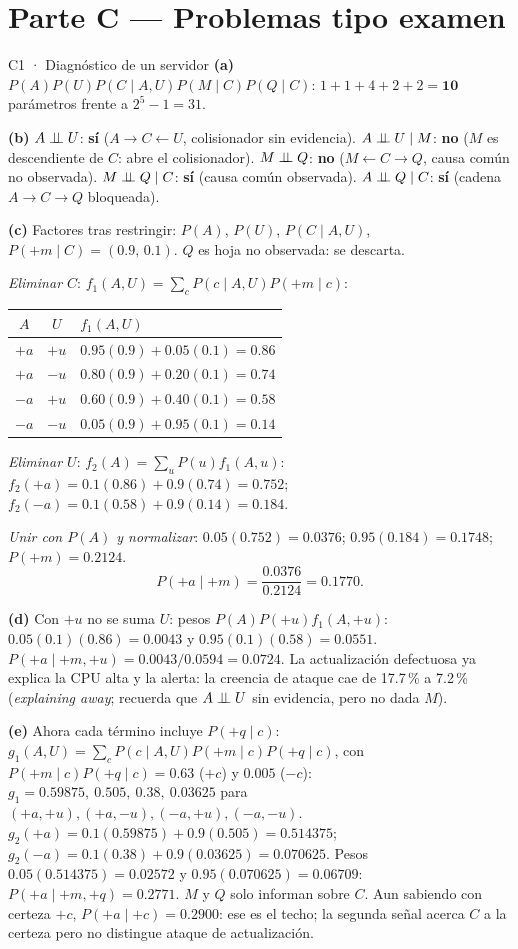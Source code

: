 \newpage
\section{Parte C — Problemas tipo examen}

\begin{solucion}{C1 · Diagnóstico de un servidor}
\textbf{(a)} $P(A)P(U)P(C\mid A,U)P(M\mid C)P(Q\mid C)$: $1+1+4+2+2=\mathbf{10}$ parámetros frente a $2^5-1=31$.

\textbf{(b)}
$A\perp\!\!\!\perp U$: \textbf{sí} ($A\to C\leftarrow U$, colisionador sin evidencia).
$A\perp\!\!\!\perp U\mid M$: \textbf{no} ($M$ es descendiente de $C$: abre el colisionador).
$M\perp\!\!\!\perp Q$: \textbf{no} ($M\leftarrow C\to Q$, causa común no observada).
$M\perp\!\!\!\perp Q\mid C$: \textbf{sí} (causa común observada).
$A\perp\!\!\!\perp Q\mid C$: \textbf{sí} (cadena $A\to C\to Q$ bloqueada).

\textbf{(c)} Factores tras restringir: $P(A)$, $P(U)$, $P(C\mid A,U)$, $P(+m\mid C)=(0.9,\,0.1)$. $Q$ es hoja no observada: se descarta.

\emph{Eliminar $C$}: $f_1(A,U)=\sum_cP(c\mid A,U)P(+m\mid c)$:
\begin{center}\small
\begin{tabular}{cc|l}
$A$ & $U$ & $f_1(A,U)$\\\hline
$+a$ & $+u$ & $0.95(0.9)+0.05(0.1)=0.86$\\
$+a$ & $-u$ & $0.80(0.9)+0.20(0.1)=0.74$\\
$-a$ & $+u$ & $0.60(0.9)+0.40(0.1)=0.58$\\
$-a$ & $-u$ & $0.05(0.9)+0.95(0.1)=0.14$
\end{tabular}
\end{center}
\emph{Eliminar $U$}: $f_2(A)=\sum_uP(u)f_1(A,u)$: $f_2(+a)=0.1(0.86)+0.9(0.74)=0.752$; $f_2(-a)=0.1(0.58)+0.9(0.14)=0.184$.

\emph{Unir con $P(A)$ y normalizar}: $0.05(0.752)=0.0376$; $0.95(0.184)=0.1748$; $P(+m)=0.2124$.
\[P(+a\mid+m)=\frac{0.0376}{0.2124}=\mathbf{0.1770}.\]

\textbf{(d)} Con $+u$ no se suma $U$: pesos $P(A)P(+u)f_1(A,+u)$: $0.05(0.1)(0.86)=0.0043$ y $0.95(0.1)(0.58)=0.0551$.
$P(+a\mid+m,+u)=0.0043/0.0594=\mathbf{0.0724}$. La actualización defectuosa ya explica la CPU alta y la alerta: la creencia de ataque cae de
17.7\,\% a 7.2\,\% (\emph{explaining away}; recuerda que $A\perp\!\!\!\perp U$ sin evidencia, pero no dada $M$).

\textbf{(e)} Ahora cada término incluye $P(+q\mid c)$: $g_1(A,U)=\sum_cP(c\mid A,U)P(+m\mid c)P(+q\mid c)$, con $P(+m\mid c)P(+q\mid c)=0.63$ ($+c$) y $0.005$ ($-c$):
$g_1=0.59875,\ 0.505,\ 0.38,\ 0.03625$ para $(+a,+u),(+a,-u),(-a,+u),(-a,-u)$.
$g_2(+a)=0.1(0.59875)+0.9(0.505)=0.514375$; $g_2(-a)=0.1(0.38)+0.9(0.03625)=0.070625$.
Pesos $0.05(0.514375)=0.02572$ y $0.95(0.070625)=0.06709$: $P(+a\mid+m,+q)=\mathbf{0.2771}$.
$M$ y $Q$ solo informan sobre $C$. Aun sabiendo con certeza $+c$, $P(+a\mid+c)=0.2900$: ese es el techo; la segunda señal acerca $C$ a la certeza
pero no distingue ataque de actualización.
\end{solucion}

